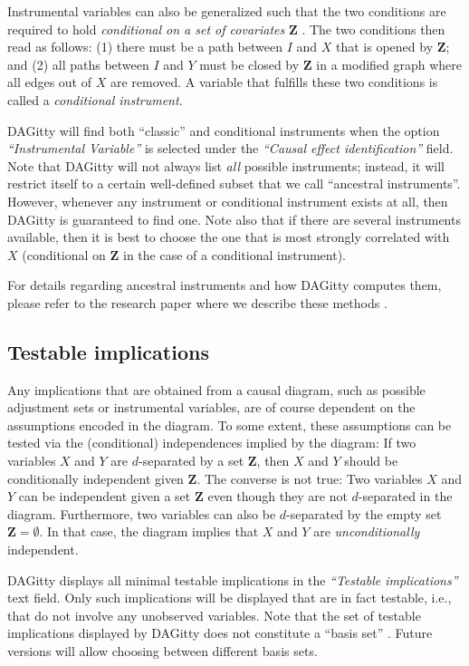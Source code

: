 \documentclass[a4paper]{article} %
\newcommand{\pp}{{\sc DAG}itty\xspace}
\newcommand{\action}[1]{\emph{``#1''}}
\begin{document}
Instrumental variables can also be generalized such that the two conditions are required
to hold \emph{conditional on a set of covariates} $\mathbf{Z}$ \cite{BritoPearlUAI02}. 
The two conditions then read as follows: 
(1) there must be a path between 
$I$ and $X$ that is opened by $\mathbf{Z}$; and (2) 
all paths between $I$ and $Y$ must be closed by $\mathbf{Z}$ 
in a modified graph where all edges out of $X$ are removed. 
A variable that fulfills these two conditions is called a
\emph{conditional instrument}.

\pp will find both ``classic'' and conditional instruments when the option 
\action{Instrumental Variable} is selected under the \action{Causal effect identification} 
field. Note that \pp will not always list \emph{all} possible instruments;
instead, it will restrict itself to a certain well-defined subset that we call 
``ancestral instruments''. However, whenever any instrument or conditional instrument
exists at all, then \pp is guaranteed to find one. Note also that if there are several
instruments available, then it is best to choose the one that is most strongly
correlated with $X$ (conditional on $\mathbf{Z}$ in the case of a conditional instrument).

For details regarding ancestral instruments and how \pp computes them, please
refer to the research paper where we describe these methods \cite{zander15_instrument}.

\subsection{Testable implications}

Any implications that are obtained from a causal diagram,
such as possible adjustment sets or instrumental variables,
are of course dependent on the 
assumptions encoded in the diagram.
To some extent, these assumptions can be tested via the 
(conditional) independences implied by the diagram: If two 
variables $X$ and $Y$ are $d$-separated by a set $\mathbf{Z}$, then
$X$ and $Y$ should be conditionally independent
given $\mathbf{Z}$. The converse is not true: Two variables
$X$ and $Y$ can be independent given a set $\mathbf{Z}$ even though they
are not $d$-separated in the diagram. Furthermore, two 
variables can also be $d$-separated by the empty set $\mathbf{Z}=\emptyset$.
In that case, the diagram implies that $X$ and $Y$ are
\emph{unconditionally} independent.

\pp displays all minimal testable implications 
in the \action{Testable implications} text field. Only such
implications will be displayed that are in fact testable,
i.e., that do not involve any unobserved variables. Note
that the set of testable implications displayed by \pp
does not constitute a ``basis set'' \cite{Pearl2009}. 
Future versions will allow choosing between different basis sets. 
\end{document}

